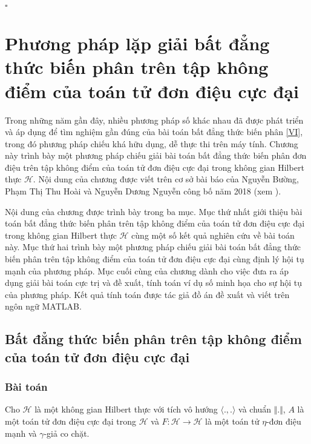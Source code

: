 \documentclass[14pt, oneside,A4paper]{book}
\theoremstyle{plain}
\newcommand{\eproof}{\hfill $\square$}
\begin{document}
\eproof


\chapter{Phương pháp lặp giải bất đẳng thức biến phân trên tập không điểm của toán tử đơn điệu cực đại}

Trong những năm gần đây, nhiều phương pháp số khác nhau đã được phát triển và áp dụng để tìm nghiệm gần đúng của bài toán bất đẳng thức biến phân \eqref{VI}, trong đó phương pháp chiếu khá hữu dụng, dễ thực thi trên máy tính. Chương này trình bày một phương pháp chiếu giải bài toán bất đẳng thức biến phân đơn điệu trên tập không điểm của toán tử đơn điệu cực đại trong không gian Hilbert thực $\mathcal H$. Nội dung của chương được viết trên cơ sở bài báo của Nguyễn Bường, Phạm Thị Thu Hoài và Nguyễn Dương Nguyễn công bố năm 2018 (xem \cite{BHN}).

Nội dung của chương được trình bày trong ba mục. Mục thứ nhất giới thiệu bài toán bất đẳng thức biến phân trên tập không điểm của toán tử đơn điệu cực đại trong không gian Hilbert thực $\mathcal H$ cùng một số kết quả nghiên cứu về bài toán này. Mục thứ hai trình bày một phương pháp chiếu giải bài toán bất đẳng thức biến phân trên tập không điểm của toán tử đơn điệu cực đại cùng định lý hội tụ mạnh của phương pháp. Mục cuối cùng của chương dành cho việc đưa ra áp dụng giải bài toán cực trị và đề xuất, tính toán ví dụ số minh họa cho sự hội tụ của phương pháp. Kết quả tính toán được tác giả đồ án đề xuất và viết trên ngôn ngữ MATLAB.


\section{Bất đẳng thức biến phân trên tập không điểm của toán tử đơn điệu cực đại}

\subsection{Bài toán}

Cho $\mathcal H$ là một không gian Hilbert thực với tích vô hướng $\langle .,. \rangle$ và chuẩn $\Vert . \Vert$,   $A$ là một toán tử đơn điệu cực đại trong $\mathcal H$ và
 $F:\mathcal H\rightarrow \mathcal H$ là một toán tử $\eta$-đơn điệu mạnh và $\gamma$-giả co chặt.
\end{document}
